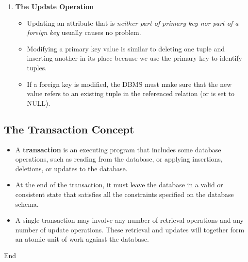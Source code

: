 \documentclass[10pt]{article}
\newcommand{\tf}{\textbf}
\newcommand{\ti}{\textit}
\begin{document}
\begin{enumerate}
	\item \tf{The Update Operation}
	\begin{itemize}
		\item Updating an attribute that is \ti{neither part of primary key nor part of a foreign key} usually causes no problem.
		\item Modifying a primary key value is similar to deleting one tuple and inserting another in its place because we use the primary key to identify tuples.
		\item If a foreign key is modified, the DBMS must make sure that the new value refers to an existing tuple in the referenced relation (or is set to NULL).
	\end{itemize}
\end{enumerate}

\subsection{The Transaction Concept}
\begin{itemize}
	\item A \tf{transaction} is an executing program that includes some database operations, such as reading from the database, or applying insertions, deletions, or updates to the database.
	\item At the end of the transaction, it must leave the database in a valid or consistent state that satisfies all the constraints specified on the database schema.
	\item A single transaction may involve any number of retrieval operations and any number of update operations. These retrieval and updates will together form an atomic unit of work against the database.
\end{itemize}

\begin{center}
	End
\end{center}

\pagebreak
\end{document}
